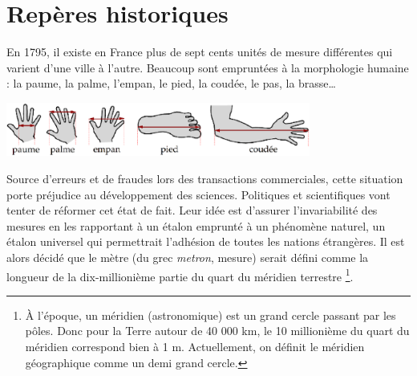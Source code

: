    
\cours

\section{Repères historiques} %
\label{un}

En 1795, il existe en France plus de sept cents unités de mesure différentes qui varient d'une ville à l'autre. Beaucoup sont empruntées à la morphologie humaine : la paume, la palme, l'empan, le pied, la coudée, le pas, la brasse\dots{} 
\begin{center}
   \includegraphics[width=10cm]{Grandeurs_mesures/Images/M13_cours_humain}
\end{center}
Source d'erreurs et de fraudes lors des transactions commerciales, cette situation porte préjudice au développement des sciences. Politiques et scientifiques vont tenter de réformer cet état de fait. Leur idée est d'assurer l'invariabilité des mesures en les rapportant à un étalon emprunté à un phénomène naturel, un étalon universel qui permettrait l'adhésion de toutes les nations étrangères. Il est alors décidé que le mètre (du grec \textit{metron}, mesure) serait défini comme la longueur de la dix-millionième partie du quart du méridien terrestre \footnote{À l’époque, un méridien (astronomique) est un grand cercle passant par les pôles. Donc pour la Terre autour de 40 000 km, le 10 millionième du quart du méridien correspond bien à 1 m. Actuellement, on définit le méridien géographique comme un demi grand cercle.}. 

